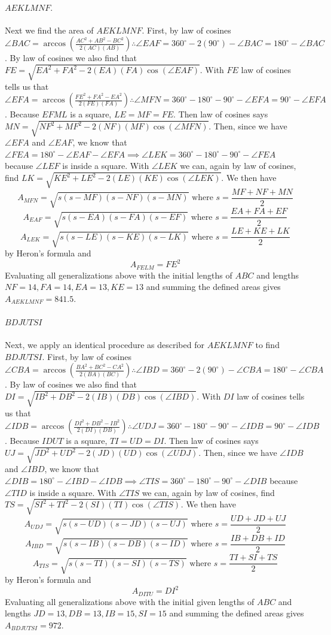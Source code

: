 \documentclass[10pt]{article}
\theoremstyle{plain}
\theoremstyle{definition}
\theoremstyle{remark}
\begin{document}
\paragraph{\(AEKLMNF.\)} Next we find the area of \(AEKLMNF\). First, by law of cosines \(\angle BAC=\arccos\left(\frac{AC^2+AB^2-BC^2}{2(AC)(AB)}\right)\therefore \angle EAF=360^{\circ}-2(90^{\circ})-\angle BAC=180^{\circ}-\angle BAC\). By law of cosines we also find that \(FE=\sqrt{EA^2+FA^2-2(EA)(FA)\cos(\angle EAF)}\). With \(FE\) law of cosines tells us that \(\angle EFA=\arccos\left(\frac{FE^2+FA^2-EA^2}{2(FE)(FA)}\right)\therefore \angle MFN=360^{\circ}-180^{\circ}-90^{\circ}-\angle EFA=90^{\circ}-\angle EFA\). Because \(EFML\) is a square, \(LE=MF=FE\). Then law of cosines says \(MN=\sqrt{NF^2+MF^2-2(NF)(MF)\cos(\angle MFN)}\). Then, since we have \(\angle EFA\) and \(\angle EAF\), we know that \(\angle FEA=180^{\circ}-\angle EAF -\angle EFA\implies \angle LEK=360^{\circ}-180^{\circ}-90^{\circ}-\angle FEA\) because \(\angle LEF\) is inside a square. With \(\angle LEK\) we can, again by law of cosines, find \(LK=\sqrt{KE^2+LE^2-2(LE)(KE)\cos(\angle LEK)}\). We then have 
\[A_{MFN}=\sqrt{s(s-MF)(s-NF)(s-MN)} \text{ where }s=\frac{MF+NF+MN}{2}\]
\[A_{EAF}=\sqrt{s(s-EA)(s-FA)(s-EF)} \text{ where }s=\frac{EA+FA+EF}{2}\]
\[A_{LEK}=\sqrt{s(s-LE)(s-KE)(s-LK)} \text{ where }s=\frac{LE+KE+LK}{2}\]
by Heron's formula and 
\[A_{FELM}=FE^2\]
Evaluating all generalizations above with the initial lengths of \(ABC\) and lengths \(NF=14,FA=14, EA=13, KE=13\) and summing the defined areas gives \(A_{AEKLMNF}=841.5\).

\paragraph{\(BDJUTSI\)} Next, we apply an identical procedure as described for \(AEKLMNF\) to find \(BDJUTSI\). First, by law of cosines \(\angle CBA=\arccos\left(\frac{BA^2+BC^2-CA^2}{2(BA)(BC)}\right)\therefore \angle IBD=360^{\circ}-2(90^{\circ})-\angle CBA=180^{\circ}-\angle CBA\). By law of cosines we also find that \(DI=\sqrt{IB^2+DB^2-2(IB)(DB)\cos(\angle IBD)}\). With \(DI\) law of cosines tells us that \(\angle IDB=\arccos\left(\frac{DI^2+DB^2-IB^2}{2(DI)(DB)}\right)\therefore \angle UDJ=360^{\circ}-180^{\circ}-90^{\circ}-\angle IDB=90^{\circ}-\angle IDB\). Because \(IDUT\) is a square, \(TI=UD=DI\). Then law of cosines says \(UJ=\sqrt{JD^2+UD^2-2(JD)(UD)\cos(\angle UDJ)}\). Then, since we have \(\angle IDB\) and \(\angle IBD\), we know that \(\angle DIB=180^{\circ}-\angle IBD -\angle IDB\implies \angle TIS=360^{\circ}-180^{\circ}-90^{\circ}-\angle DIB\) because \(\angle TID\) is inside a square. With \(\angle TIS\) we can, again by law of cosines, find \(TS=\sqrt{SI^2+TI^2-2(SI)(TI)\cos(\angle TIS)}\). We then have 
\[A_{UDJ}=\sqrt{s(s-UD)(s-JD)(s-UJ)} \text{ where }s=\frac{UD+JD+UJ}{2}\]
\[A_{IBD}=\sqrt{s(s-IB)(s-DB)(s-ID)} \text{ where }s=\frac{IB+DB+ID}{2}\]
\[A_{TIS}=\sqrt{s(s-TI)(s-SI)(s-TS)} \text{ where }s=\frac{TI+SI+TS}{2}\]
by Heron's formula and 
\[A_{DITU}=DI^2\]
Evaluating all generalizations above with the initial given lengths of \(ABC\) and lengths \(JD=13,DB=13, IB=15, SI=15\) and summing the defined areas gives \(A_{BDJUTSI}=972\).
\end{document}
